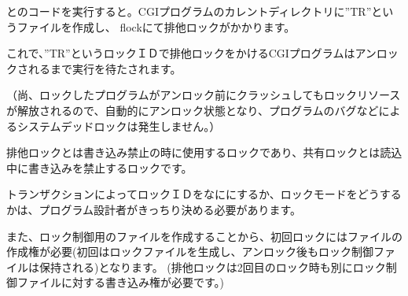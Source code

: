 \begin{itemize}
とのコードを実行すると。CGIプログラムのカレントディレクトリに''TR''というファイルを作成し、
flockにて排他ロックがかかります。

これで、''TR''というロックＩＤで排他ロックをかけるCGIプログラムはアンロックされるまで実行を待たされます。

（尚、ロックしたプログラムがアンロック前にクラッシュしてもロックリソースが解放されるので、自動的にアンロック状態となり、プログラムのバグなどによるシステムデッドロックは発生しません。）

排他ロックとは書き込み禁止の時に使用するロックであり、共有ロックとは読込中に書き込みを禁止するロックです。

トランザクションによってロックＩＤをなににするか、ロックモードをどうするかは、プログラム設計者がきっちり決める必要があります。

また、ロック制御用のファイルを作成することから、初回ロックにはファイルの作成権が必要(初回はロックファイルを生成し、アンロック後もロック制御ファイルは保持される)となります。
(排他ロックは2回目のロック時も別にロック制御ファイルに対する書き込み権が必要です。)

\vspace{1em}


\end{itemize}



